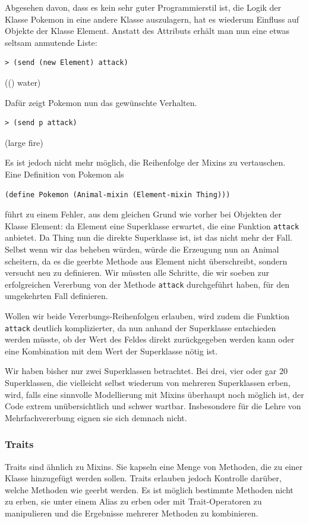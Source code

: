 Abgesehen davon, dass es kein sehr guter Programmierstil ist, die Logik der Klasse Pokemon in eine andere Klasse auszulagern, hat es wiederum Einfluss auf Objekte der Klasse Element. Anstatt des Attributs erhält man nun eine etwas seltsam anmutende Liste:

\begin{lstlisting}
> (send (new Element) attack)
\end{lstlisting}
{\rsymbol (() water)}

Dafür zeigt Pokemon nun das gewünschte Verhalten.
\begin{lstlisting}
> (send p attack)
\end{lstlisting}
{\rsymbol (large fire)}

Es ist jedoch nicht mehr möglich, die Reihenfolge der Mixins zu vertauschen. Eine Definition von Pokemon als

\begin{lstlisting}
(define Pokemon (Animal-mixin (Element-mixin Thing)))
\end{lstlisting}

führt zu einem Fehler, aus dem gleichen Grund wie vorher bei Objekten der Klasse Element: da Element eine Superklasse erwartet, die eine Funktion \texttt{attack} anbietet. Da Thing nun die direkte Superklasse ist, ist das nicht mehr der Fall. Selbst wenn wir das beheben würden, würde die Erzeugung nun an Animal scheitern, da es die geerbte Methode aus Element nicht überschreibt, sondern versucht neu zu definieren. Wir müssten alle Schritte, die wir soeben zur erfolgreichen Vererbung von der Methode \texttt{attack} durchgeführt haben, für den umgekehrten Fall definieren. 

Wollen wir beide Vererbungs-Reihenfolgen erlauben, wird zudem die Funktion \texttt{attack} deutlich komplizierter, da nun anhand der Superklasse entschieden werden müsste, ob der Wert des Feldes direkt zurückgegeben werden kann oder eine Kombination mit dem Wert der Superklasse nötig ist.

Wir haben bisher nur zwei Superklassen betrachtet. Bei drei, vier oder gar 20 Superklassen, die vielleicht selbst wiederum von mehreren Superklassen erben, wird, falls eine sinnvolle Modellierung mit Mixins überhaupt noch möglich ist, der Code extrem unübersichtlich und schwer wartbar. Insbesondere für die Lehre von Mehrfachvererbung eignen sie sich demnach nicht.

\subsubsection{Traits}
Traits sind ähnlich zu Mixins. Sie kapseln eine Menge von Methoden, die zu einer Klasse hinzugefügt werden sollen. Traits erlauben jedoch Kontrolle darüber, welche Methoden wie geerbt werden. Es ist möglich bestimmte Methoden nicht zu erben, sie unter einem Alias zu erben oder mit Trait-Operatoren zu manipulieren und die Ergebnisse mehrerer Methoden zu kombinieren.

